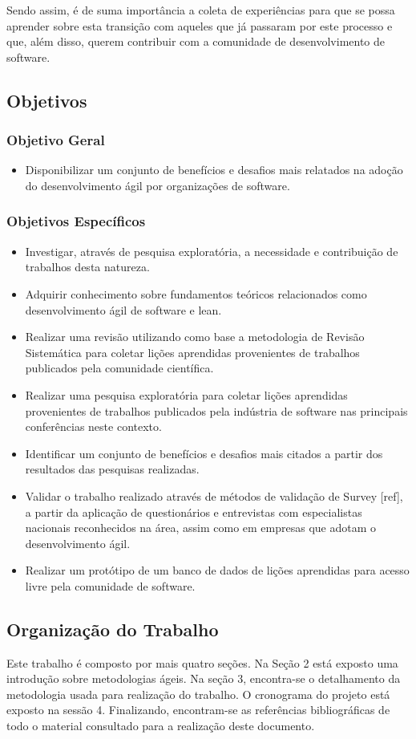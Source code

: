 \documentclass[a4paper,11pt]{article}
\begin{document}
Sendo assim, é de suma importância a coleta de experiências para que se possa aprender sobre esta transição com aqueles que já passaram por este processo e que, além disso, querem contribuir com a comunidade de desenvolvimento de software.
\subsection{Objetivos}
\subsubsection{Objetivo Geral}
\begin{itemize}
	\item Disponibilizar um conjunto de benefícios e desafios mais relatados na adoção do desenvolvimento ágil por organizações de software.
\end{itemize}
\subsubsection{Objetivos Específicos}
\begin{itemize}
	\item Investigar, através de pesquisa exploratória, a necessidade e contribuição de trabalhos desta natureza.
	\item Adquirir conhecimento sobre fundamentos teóricos relacionados como desenvolvimento ágil de software e lean.
	\item Realizar uma revisão utilizando como base a metodologia de Revisão Sistemática \cite{Barbara2004} para coletar lições aprendidas provenientes de trabalhos publicados pela comunidade científica.
	\item Realizar uma pesquisa exploratória para coletar lições aprendidas provenientes de trabalhos publicados pela indústria de software nas principais conferências neste contexto.
	\item Identificar um conjunto de benefícios e desafios mais citados a partir dos resultados das pesquisas realizadas.
	\item Validar o trabalho realizado através de métodos de validação de Survey [ref], a partir da aplicação de questionários e entrevistas com especialistas nacionais reconhecidos na área, assim como em empresas que adotam o desenvolvimento ágil.
	\item Realizar um protótipo de um banco de dados de lições aprendidas para acesso livre pela comunidade de software.
\end{itemize}
\subsection{Organização do Trabalho}
Este trabalho é composto por mais quatro seções. Na Seção 2 está exposto uma introdução sobre metodologias ágeis. Na seção 3,  encontra-se o detalhamento da metodologia usada para realização do trabalho. O cronograma do projeto está exposto na sessão 4. Finalizando, encontram-se as referências bibliográficas de todo o material consultado para a realização deste documento.
\end{document}
